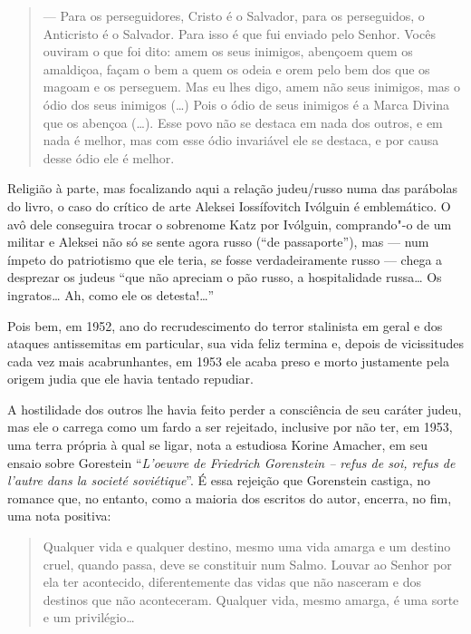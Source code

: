 {\begin{quote}
\noindent{}--- Para os perseguidores, Cristo é o Salvador, para os perseguidos, o
Anticristo é o Salvador. Para isso é que fui enviado pelo Senhor. Vocês
ouviram o que foi dito: amem os seus inimigos, abençoem quem os
amaldiçoa, façam o bem a quem os odeia e orem pelo bem dos que os magoam
e os perseguem. Mas eu lhes digo, amem não seus inimigos, mas o ódio dos
seus inimigos (\ldots{}) Pois o ódio de seus inimigos é a Marca Divina que os
abençoa (\ldots{}). Esse povo não se destaca em nada dos outros, e em nada é
melhor, mas com esse ódio invariável ele se destaca, e por causa desse
ódio ele é melhor.
\end{quote}

Religião à parte, mas focalizando aqui a relação judeu/russo numa das
parábolas do livro, o caso do crítico de arte Aleksei Iossífovitch
Ivólguin é emblemático. O avô dele conseguira trocar o sobrenome Katz por
Ivólguin, comprando"-o de um militar e Aleksei não só se sente agora
russo (``de passaporte''), mas --- num ímpeto do patriotismo que ele
teria, se fosse verdadeiramente russo --- chega a desprezar os judeus
``que não apreciam o pão russo, a hospitalidade russa\ldots{} Os ingratos\ldots{}
Ah, como ele os detesta!\ldots{}''

Pois bem, em 1952, ano do recrudescimento do terror stalinista em geral
e dos ataques antissemitas em particular, sua vida feliz termina e,
depois de vicissitudes cada vez mais acabrunhantes, em 1953 ele acaba
preso e morto justamente pela origem judia que ele havia tentado
repudiar.

A hostilidade dos outros lhe havia feito perder a consciência de seu
caráter judeu, mas ele o carrega como um fardo a ser rejeitado,
inclusive por não ter, em 1953, uma terra própria à qual se ligar, nota
a estudiosa Korine Amacher, em seu ensaio sobre Gorestein ``\emph{L'oeuvre de
Friedrich Gorenstein -- refus de soi, refus de l'autre dans la societé
soviétique}''. É essa rejeição que Gorenstein castiga, no romance que, no entanto, como a maioria dos escritos do autor, encerra,
no fim, uma nota positiva: 

\begin{quote}
Qualquer vida e qualquer destino, mesmo uma
vida amarga e um destino cruel, quando passa, deve se constituir num
Salmo. Louvar ao Senhor por ela ter acontecido, diferentemente das vidas
que não nasceram e dos destinos que não aconteceram. Qualquer vida,
mesmo amarga, é uma sorte e um privilégio\ldots{}
\end{quote}

}
